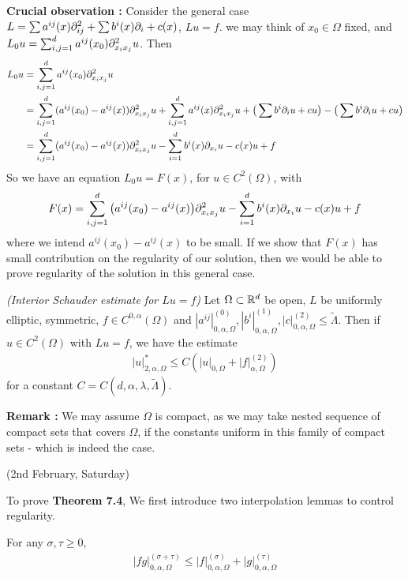 \documentclass[12pt,a4paper]{article}
\begin{document}
\textbf{Crucial observation :} Consider the general case $L =\sum a^{ij}(x) \partial^2_{ij} + \sum b^i(x) \partial_i +c(x)$, $Lu =f$. we may think of $x_0\in \Omega$ fixed, and $L_0 u = \sum_{i,j=1}^d a^{ij}(x_0)  \partial_{x_i x_j}^2 u$. Then
\begin{align*}
L_0 u &= \sum_{i,j=1}^d a^{ij}(x_0) \partial_{x_i x_j}^2 u \\
&=\sum_{i,j=1}^d (a^{ij}(x_0) - a^{ij}(x))\partial^2_{x_i x_j} u + \sum_{i,j=1}^d a^{ij}(x) \partial^2_{x_i x_j} u + \big( \sum b^i\partial_i u + cu \big) - \big( \sum b^i\partial_i u + cu \big) \\
&= \sum_{i,j=1}^d (a^{ij}(x_0) - a^{ij}(x))\partial^2_{x_i x_j} u - \sum_{i=1}^d b^i(x) \partial_{x_i} u -c(x)u +f
\end{align*}
So we have an equation $L_0 u =F(x)$, for $u\in C^2(\Omega)$, with
\begin{align*}
F(x)= \sum_{i,j=1}^d \big( a^{ij}(x_0) - a^{ij}(x) \big) \partial^2_{x_i x_j}u  - \sum_{i=1}^d b^i(x) \partial_{x_i} u -c(x)u +f
\end{align*}
where we intend $a^{ij}(x_0) - a^{ij}(x)$ to be small. If we show that $F(x)$ has small contribution on the regularity of our solution, then we would be able to prove regularity of the solution in this general case.
\s

 \emph{(Interior Schauder estimate for $Lu=f$)} Let $\Omega \subset \mathbb{R}^d$ be open, $L$ be uniformly elliptic, symmetric, $f\in C^{0, \alpha}(\Omega)$ and $|a^{ij}|^{(0)}_{0, \alpha, \Omega}, |b^i|^{(1)}_{0, \alpha, \Omega}, |c|^{(2)}_{0, \alpha, \Omega} \leq \tilde{\Lambda}$. Then if $u\in C^2(\Omega)$ with $Lu =f$, we have the estimate
\begin{align*}
|u|^*_{2, \alpha, \Omega} \leq C(|u|_{0, \Omega} + |f|^{(2)}_{\alpha, \Omega})
\end{align*}
for a constant $C= C(d, \alpha, \lambda, \tilde{\Lambda})$.
\s

\textbf{Remark :} We may assume $\Omega$ is compact, as we may take nested sequence of compact sets that covers $\Omega$, if the constants uniform in this family of compact sets - which is indeed the case.
\s

\newday

(2nd February, Saturday)
\s

To prove \textbf{Theorem 7.4}, We first introduce two interpolation lemmas to control regularity.
\s

 For any $\sigma,\tau \geq 0$,
\begin{align*}
|fg|^{(\sigma +\tau)}_{0, \alpha, \Omega}\leq |f|^{(\sigma)}_{0, \alpha, \Omega} + |g|^{(\tau)}_{0, \alpha, \Omega}
\end{align*}
\s
\end{document}
